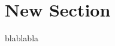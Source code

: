 \documentclass[compress, xcolor=table]{beamer}
\begin{document}
\maketitle
\section{New Section}
\begin{frame}
blablabla
\end{frame}
\end{document}
